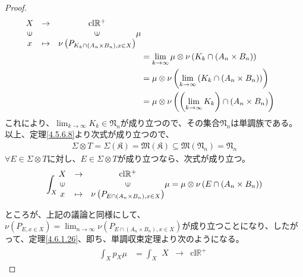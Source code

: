 \documentclass[dvipdfmx]{jsarticle}
\begin{document}
\begin{proof}
\begin{align*}
{{\begin{matrix}
X & \rightarrow & \mathrm{cl}\mathbb{R}^{+} \\
\text{\rotatebox[origin=c]{90}{$\in$}} & & \text{\rotatebox[origin=c]{90}{$\in$}} \\
x & \mapsto & \nu\left( P_{K_{k} \cap \left( A_{n} \times B_{n} \right),x \in X} \right) \\
\end{matrix}\mu}}\\
&= \lim_{k \rightarrow \infty}{\mu \otimes \nu\left( K_{k} \cap \left( A_{n} \times B_{n} \right) \right)}\\
&= \mu \otimes \nu\left( \lim_{k \rightarrow \infty}\left( K_{k} \cap \left( A_{n} \times B_{n} \right) \right) \right)\\
&= \mu \otimes \nu\left( \left( \lim_{k \rightarrow \infty}K_{k} \right) \cap \left( A_{n} \times B_{n} \right) \right)
\end{align*}
これにより、$\lim_{k \rightarrow \infty}K_{k} \in \mathfrak{N}_{n}$が成り立つので、その集合$\mathfrak{N}_{n}$は単調族である。以上、定理\ref{4.5.6.8}より次式が成り立つので、
\begin{align*}
\varSigma \otimes T = \varSigma\left( \mathfrak{K} \right) = \mathfrak{M}\left( \mathfrak{K} \right)\subseteq \mathfrak{M}\left( \mathfrak{N}_{n} \right) = \mathfrak{N}_{n}
\end{align*}
$\forall E \in \varSigma \otimes T$に対し、$E \in \varSigma \otimes T$が成り立つなら、次式が成り立つ。
\begin{align*}
\int_{X} {\begin{matrix}
X & \rightarrow & \mathrm{cl}\mathbb{R}^{+} \\
\text{\rotatebox[origin=c]{90}{$\in$}} & & \text{\rotatebox[origin=c]{90}{$\in$}} \\
x & \mapsto & \nu\left( P_{E \cap \left( A_{n} \times B_{n} \right),x \in X} \right) \\
\end{matrix}\mu} = \mu \otimes \nu\left( E \cap \left( A_{n} \times B_{n} \right) \right)
\end{align*}\par
ところが、上記の議論と同様にして、$\nu\left( P_{E,x \in X} \right) = \lim_{n \rightarrow \infty}{\nu\left( P_{E \cap \left( A_{n} \times B_{n} \right),x \in X} \right)}$が成り立つことになり、したがって、定理\ref{4.6.1.26}、即ち、単調収束定理より次のようになる。
\begin{align*}
\int_{X} {p_{X}\mu} &= \int_{X} {\begin{matrix}
X & \rightarrow & \mathrm{cl}\mathbb{R}^{+} \\

\end{matrix}}
\end{align*}
\end{proof}
\end{document}
